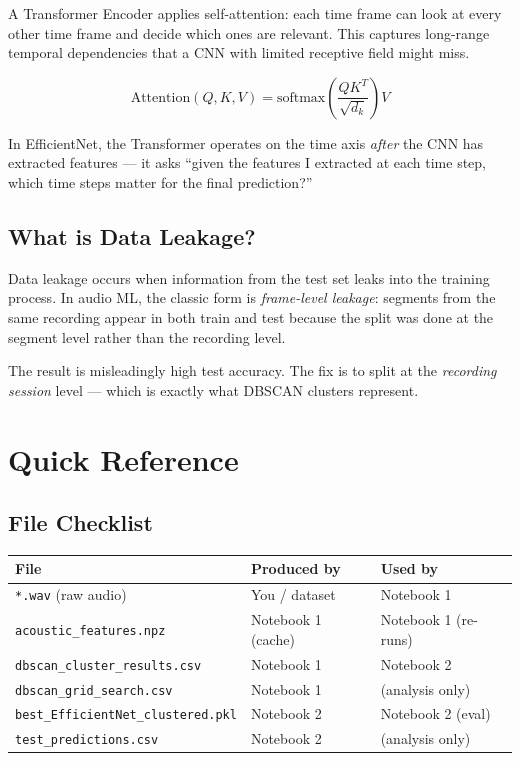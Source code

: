 \documentclass[12pt,a4paper]{article}
\begin{document}
A Transformer Encoder applies self-attention: each time frame can look at every other time frame and decide which ones are relevant. This captures long-range temporal dependencies that a CNN with limited receptive field might miss.

\[
\text{Attention}(Q, K, V) = \text{softmax}\!\left(\frac{QK^T}{\sqrt{d_k}}\right) V
\]

In EfficientNet, the Transformer operates on the time axis \textit{after} the CNN has extracted features --- it asks ``given the features I extracted at each time step, which time steps matter for the final prediction?''

\subsection{What is Data Leakage?}

Data leakage occurs when information from the test set leaks into the training process. In audio ML, the classic form is \textit{frame-level leakage}: segments from the same recording appear in both train and test because the split was done at the segment level rather than the recording level.

The result is misleadingly high test accuracy. The fix is to split at the \textit{recording session} level --- which is exactly what DBSCAN clusters represent.


\section{Quick Reference}

\subsection{File Checklist}

\begin{center}
\begin{tabular}{lll}
\toprule
\textbf{File} & \textbf{Produced by} & \textbf{Used by} \\
\midrule
\texttt{*.wav} (raw audio) & You / dataset & Notebook 1 \\
\texttt{acoustic\_features.npz} & Notebook 1 (cache) & Notebook 1 (re-runs) \\
\texttt{dbscan\_cluster\_results.csv} & Notebook 1 & Notebook 2 \\
\texttt{dbscan\_grid\_search.csv} & Notebook 1 & (analysis only) \\
\texttt{best\_EfficientNet\_clustered.pkl} & Notebook 2 & Notebook 2 (eval) \\
\texttt{test\_predictions.csv} & Notebook 2 & (analysis only) \\
\bottomrule
\end{tabular}
\end{center}
\end{document}
